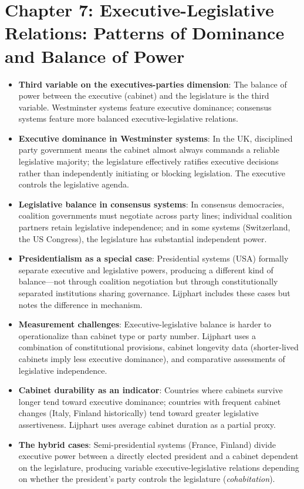 \documentclass[12pt]{article}
\begin{document}
\section{Chapter 7: Executive-Legislative Relations: Patterns of Dominance and Balance of Power}

\begin{itemize}[leftmargin=*, itemsep=4pt]
    \item \textbf{Third variable on the executives-parties dimension}: The balance of power between the executive (cabinet) and the legislature is the third variable. Westminster systems feature executive dominance; consensus systems feature more balanced executive-legislative relations.
    \item \textbf{Executive dominance in Westminster systems}: In the UK, disciplined party government means the cabinet almost always commands a reliable legislative majority; the legislature effectively ratifies executive decisions rather than independently initiating or blocking legislation. The executive controls the legislative agenda.
    \item \textbf{Legislative balance in consensus systems}: In consensus democracies, coalition governments must negotiate across party lines; individual coalition partners retain legislative independence; and in some systems (Switzerland, the US Congress), the legislature has substantial independent power.
    \item \textbf{Presidentialism as a special case}: Presidential systems (USA) formally separate executive and legislative powers, producing a different kind of balance---not through coalition negotiation but through constitutionally separated institutions sharing governance. Lijphart includes these cases but notes the difference in mechanism.
    \item \textbf{Measurement challenges}: Executive-legislative balance is harder to operationalize than cabinet type or party number. Lijphart uses a combination of constitutional provisions, cabinet longevity data (shorter-lived cabinets imply less executive dominance), and comparative assessments of legislative independence.
    \item \textbf{Cabinet durability as an indicator}: Countries where cabinets survive longer tend toward executive dominance; countries with frequent cabinet changes (Italy, Finland historically) tend toward greater legislative assertiveness. Lijphart uses average cabinet duration as a partial proxy.
    \item \textbf{The hybrid cases}: Semi-presidential systems (France, Finland) divide executive power between a directly elected president and a cabinet dependent on the legislature, producing variable executive-legislative relations depending on whether the president's party controls the legislature (\textit{cohabitation}).
\end{itemize}
\end{document}
